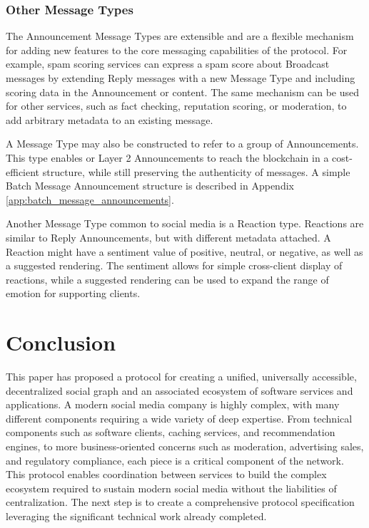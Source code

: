\documentclass[12pt,letterpaper]{article}
\begin{document}
\subsubsection{Other Message Types}

The Announcement Message Types are extensible and are a flexible mechanism for adding new
features to the core messaging capabilities of the protocol. For example, spam scoring
services can express a spam score about Broadcast messages by extending Reply messages
with a new Message Type and including scoring data in the Announcement or content. The
same mechanism can be used for other services, such as fact checking, reputation scoring,
or moderation, to add arbitrary metadata to an existing message.

A Message Type may also be constructed to refer to a group of Announcements. This type
enables  or Layer 2 Announcements to reach the blockchain in a
cost-efficient structure, while still preserving the authenticity of messages. A simple
Batch Message Announcement structure is described in Appendix
\ref{app:batch_message_announcements}.

Another Message Type common to social media is a Reaction type. Reactions are similar to
Reply Announcements, but with different metadata attached. A Reaction might have a
sentiment value of positive, neutral, or negative, as well as a suggested rendering. The
sentiment allows for simple cross-client display of reactions, while a suggested rendering
can be used to expand the range of emotion for supporting clients.


\section{Conclusion}\label{sec:conclusion}

This paper has proposed a protocol for creating a unified, universally accessible,
decentralized social graph and an associated ecosystem of software services and
applications. A modern social media company is highly complex, with many different
components requiring a wide variety of deep expertise. From technical components such as
software clients, caching services, and recommendation engines,\cite{hashemi2017} to more
business-oriented concerns such as moderation, advertising sales, and regulatory
compliance, each piece is a critical component of the network. This protocol enables
coordination between services to build the complex ecosystem required to sustain modern
social media without the liabilities of centralization. The next step is to create a
comprehensive protocol specification leveraging the significant technical work already
completed.
\end{document}
